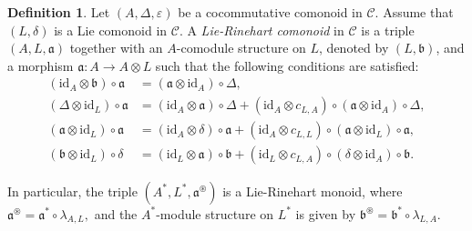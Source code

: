 \documentclass[11pt]{amsart}
\newcommand{\calC}{\mathcal{C}}
\newcommand{\id}{\mathrm{id}}
\theoremstyle{definition}
\newtheorem{defi}[theo]{Definition}
\numberwithin{equation}{section}
\begin{document}
\begin{defi}
Let $(A, \Delta, \varepsilon)$ be a cocommutative comonoid in $\calC$. Assume that $(L,\delta)$ is a Lie comonoid in $\calC$.  A \emph{Lie-Rinehart comonoid} in $\calC$ is a triple $(A,L,\mathfrak{a})$ together with an $A$-comodule structure on $L$, denoted by $(L,\mathfrak{b})$, and a morphism  $\mathfrak{a}:A \to A \otimes L$ such that the following conditions are satisfied:
\begin{align*}
				(\id_A \otimes \mathfrak{b}) \circ \mathfrak{a} &= (\mathfrak{a} \otimes \id_A) \circ \Delta,\\
				(\Delta \otimes \id_L) \circ \mathfrak{a} &=(\id_A \otimes \mathfrak{a}) \circ \Delta +(\id_A\otimes c_{L,A}) \circ (\mathfrak{a} \otimes \id_A) \circ \Delta,\\
				(\mathfrak{a} \otimes \id_L) \circ \mathfrak{a} &= (\id_A \otimes \delta) \circ \mathfrak{a}+ (\id_A \otimes c_{L,L}) \circ (\mathfrak{a} \otimes \id_L) \circ \mathfrak{a}, \\
				(\mathfrak{b} \otimes \id_L) \circ \delta &= (\id_L \otimes \mathfrak{a}) \circ \mathfrak{b} + (\id_L \otimes c_{L,A}) \circ (\delta \otimes \id_A) \circ \mathfrak{b}.
\end{align*}
\end{defi}
In particular, the triple $(A^*,L^*,\mathfrak{a}^{\circledast})$ is a Lie-Rinehart monoid, where $\mathfrak{a}^{\circledast}=\mathfrak{a}^* \circ \lambda_{A,L},$ and the $A^*$-module structure on $L^*$ is given by $\mathfrak{b}^{\circledast}=\mathfrak{b}^* \circ \lambda_{L,A}$. 
		
\end{document}
